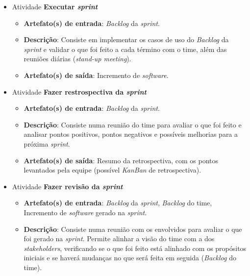 \begin{itemize}
     \item Atividade \textbf{Executar \textit{sprint}}
      
	  \begin{itemize}
	    \item \textbf{Artefato(s) de entrada}: \textit{Backlog} da \textit{sprint}.
	    
	    \item \textbf{Descrição}: Consiste em implementar os casos de uso do \textit{Backlog} da \textit{sprint}
	      e validar o que foi feito a cada término com o time, além das reuniões diárias (\textit{stand-up meeting}).
	    
	    \item \textbf{Artefato(s) de saída}: Incremento de \textit{software}.
		  
	  \end{itemize}
	  
     \item Atividade \textbf{Fazer restrospectiva da \textit{sprint}}
      
	  \begin{itemize}
	    \item \textbf{Artefato(s) de entrada}: \textit{Backlog} da \textit{sprint}.
	    
	    \item \textbf{Descrição}: Consiste numa reunião do time para avaliar o que foi feito e analisar pontos
	      positivos, pontos negativos e possíveis melhorias para a próxima \textit{sprint}.
	    
	    \item \textbf{Artefato(s) de saída}: Resumo da retrospectiva, com os pontos levantados pela equipe
	     (possível \textit{KanBan} de retrospectiva).
		  
	  \end{itemize}
	  
     \item Atividade \textbf{Fazer revisão da \textit{sprint}}
      
	  \begin{itemize}
	    \item \textbf{Artefato(s) de entrada}: \textit{Backlog} da \textit{sprint}, \textit{Backlog} do time,
	      Incremento de \textit{software} gerado na \textit{sprint}.
	    
	    \item \textbf{Descrição}: Consiste numa reunião com os envolvidos para avaliar o que foi gerado na \textit{sprint}.
	      Permite alinhar a visão do time com a dos \textit{stakeholders}, verificando se o que foi feito está
	      alinhado com os propósitos iniciais e se haverá mudanças no que será feita em seguida (\textit{Backlog} do time).
	      	    

\end{itemize}
\end{itemize}
